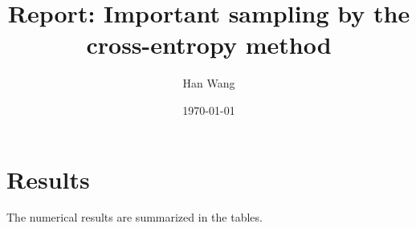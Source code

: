 \documentclass[aip,jcp,a4paper,reprint,onecolumn]{revtex4-1}
\begin{document}
\title{Report: Important sampling by the cross-entropy method}
\author{Han Wang}

\date{\today}

\begin{abstract}
\end{abstract}

\maketitle


\section{Results}
The numerical results are summarized in the tables.
\end{document}

